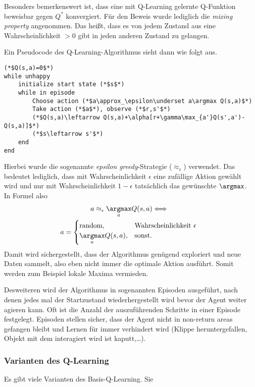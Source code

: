 \documentclass[ngerman]{../LaTeX-Templates/Paper/paper}
\begin{document}
Besonders bemerkenswert ist, dass eine mit Q-Learning gelernte Q-Funktion beweisbar gegen $Q^\ast$ konvergiert. Für den Beweis wurde lediglich die \emph{mixing property} angenommen. Das heißt, dass es von jedem Zustand aus eine Wahrscheinlichkeit $>0$ gibt in jeden anderen Zustand zu gelangen.

Ein Pseudocode des Q-Learning-Algorithmus sieht dann wie folgt aus.
\begin{lstlisting}
(*$Q(s,a)=0$*)
while unhappy
	initialize start state (*$s$*)
	while in episode
		Choose action (*$a\approx_\epsilon\underset a\argmax Q(s,a)$*)
		Take action (*$a$*), observe (*$r,s'$*)
		(*$Q(s,a)\leftarrow Q(s,a)+\alpha[r+\gamma\max_{a'}Q(s',a')-Q(s,a)]$*)
		(*$s\leftarrow s'$*)
	end
end\end{lstlisting}
Hierbei wurde die sogenannte \emph{epsilon greedy}-Strategie ($\approx_\epsilon$) verwendet. Das bedeutet lediglich, dass mit Wahrscheinlichkeit $\epsilon$ eine zufällige Aktion gewählt wird und nur mit Wahrscheinlichkeit $1-\epsilon$ tatsächlich das gewünschte $\argmax$. In Formel also
\begin{gather*}
	a\approx_\epsilon \underset a\argmax Q(s,a)\Longleftrightarrow\\ a=\begin{cases}
		\text{random},&\text{Wahrscheinlichkeit }\epsilon\\
		\underset a\argmax Q(s,a),&\text{sonst.}
	\end{cases}
\end{gather*}
Damit wird sichergestellt, dass der Algorithmus genügend exploriert und neue Daten sammelt, also eben nicht immer die optimale Aktion ausführt. Somit werden zum Beispiel lokale Maxima vermieden.

Desweiteren wird der Algorithmus in sogenannten Episoden ausgeführt, nach denen jedes mal der Startzustand wiederhergestellt wird bevor der Agent weiter agieren kann. Oft ist die Anzahl der auszuführenden Schritte in einer Episode festgelegt. Episoden stellen sicher, dass der Agent nicht in non-return areas gefangen bleibt und Lernen für immer verhindert wird (Klippe heruntergefallen, Objekt mit dem interagiert wird ist kaputt,\ldots).

\subsubsection{Varianten des Q-Learning}
Es gibt viele Varianten des Basis-Q-Learning. Sie
\end{document}
